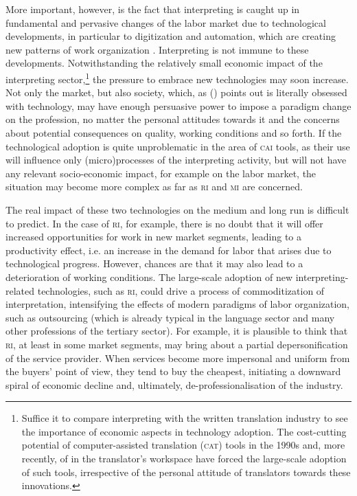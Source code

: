 \documentclass[output=paper]{langsci/langscibook}
\begin{document}
More important, however, is the fact that interpreting is caught up in fundamental and pervasive changes of the labor market due to technological developments, in particular to digitization and automation, which are creating new patterns of work organization \citep{ursula_huws_logged_2016,neufeind_work_2018}. Interpreting is not immune to these developments. Notwithstanding the relatively small economic impact of the interpreting sector,\footnote{Suffice it to compare interpreting with the written translation industry to see the importance of economic aspects in technology adoption. The cost-cutting potential of computer-assisted translation (\textsc{cat}) tools in the 1990s and, more recently, of  in the translator’s workspace have forced the large-scale adoption of such tools, irrespective of the personal attitude of translators towards these innovations.} the pressure to embrace new technologies may soon increase. Not only the market, but also society, which, as \citeauthor{besnier_homme_2012} (\citeyear{besnier_homme_2012}) points out is literally obsessed with technology, may have enough persuasive power to impose a paradigm change on the profession, no matter the personal attitudes towards it and the concerns about potential consequences on quality, working conditions and so forth. If the technological adoption is quite unproblematic in the area of \textsc{cai} tools, as their use will influence only (micro)processes of the interpreting activity, but will not have any relevant socio-economic impact, for example on the labor market, the situation may become more complex as far as \textsc{ri} and \textsc{mi} are concerned. 

The real impact of these two technologies on the medium and long run is difficult to predict. In the case of \textsc{ri}, for example, there is no doubt that it will offer increased opportunities for work in new market segments, leading to a productivity effect, i.e. an increase in the demand for labor that arises due to technological progress. However, chances are that it may also lead to a deterioration of working conditions. The large-scale adoption of new interpreting-related technologies, such as \textsc{ri}, could drive a process of commoditization of interpretation, intensifying the effects of modern paradigms of labor organization, such as outsourcing (which is already typical in the language sector and many other professions of the tertiary sector). For example, it is plausible to think that \textsc{ri}, at least in some market segments, may bring about a partial depersonification of the service provider. When services become more impersonal and uniform from the buyers’ point of view, they tend to buy the cheapest, initiating a downward spiral of economic decline and, ultimately, de-professionalisation of the industry. 
 
\end{document}
